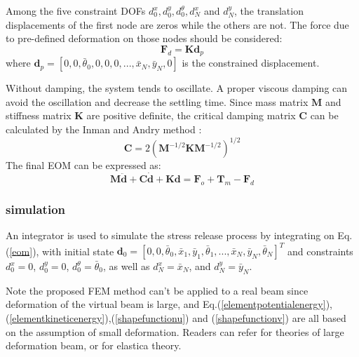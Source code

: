 \documentclass[conference, onecolumn]{IEEEtran}
\begin{document}
Among the five constraint DOFs $d^x_0,d^y_0,d^\theta_0,d^x_N$ and $d^y_N$, the translation displacements of the first node are zeros while the others are not. The force due to pre-defined deformation on those nodes should be considered:
\begin{equation}
	\boldsymbol{F}_d = \mathbf{K}\boldsymbol{d}_p
\end{equation}
where $\boldsymbol{d}_p = [0,0,\bar{\theta}_0,0,0,0,...,\bar{x}_N,\bar{y}_N,0]$ is the constrained displacement. 

Without damping, the system tends to oscillate. A proper viscous damping can avoid the oscillation and decrease the settling time.
Since mass matrix $\mathbf{M}$ and stiffness matrix $\mathbf{K}$ are positive definite, the critical damping matrix $\mathbf{C}$ can be calculated by the Inman and Andry method \cite{Inman1980SomeRO}:
\begin{equation}	
    \mathbf{C}  = 2\left(\mathbf{M}^{-1/2}\mathbf{K}\mathbf{M}^{-1/2}\right)^{1/2}
	\label{criticaldamping}
\end{equation}
The final EOM can be expressed as:
\begin{equation}\label{eom}
	\mathbf{M}\ddot{\boldsymbol{d}}+ \mathbf{C}\dot{\boldsymbol{d}}+ \mathbf{K}\boldsymbol{d}= \boldsymbol{F}_o +\boldsymbol{T}_m -\boldsymbol{F}_d 
\end{equation}

\subsubsection{simulation}
An integrator is used to simulate the stress release process by integrating on Eq.(\ref{eom}), with initial state $\boldsymbol{d}_0 = [0,0,\bar{\theta}_0,\bar{x}_1,\bar{y}_1,\bar{\theta}_1,...,\bar{x}_N,\bar{y}_N,\bar{\theta}_N]^T$ and constraints $d^x_0=0$, $d^y_0=0$, $d^\theta_0=\bar{\theta}_0$, as well as $d^x_N=\bar{x}_N$, and $d^y_N=\bar{y}_N$.

Note the proposed FEM method can't be applied to a real beam since deformation of the virtual beam is large, and Eq.(\ref{elementpotentialenergy}),(\ref{elementkineticenergy}),(\ref{shapefunctionu}) and (\ref{shapefunctionv}) are all based on the assumption of small deformation. Readers can refer \cite{largedeformationbeam} for theories of large deformation beam, or \cite{kim2021physicsinformed}\cite{Levien:EECS-2008-103} for elastica theory.
\end{document}

